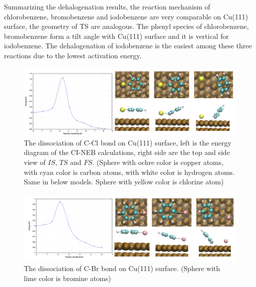\documentclass[%
 reprint,
 amsmath,amssymb,
 aps,
prb,
]{revtex4-1}
\begin{document}

Summarizing the dehalogenation results, the reaction mechanism of chlorobenzene, bromobenzene and iodobenzene are very comparable on Cu(111) surface, the geometry of TS are analogous. The phenyl species of chlorobenzene, bromobenzene form a tilt angle with Cu(111) surface and it is vertical for iodobenzene. The dehalogenation of iodobenzene is the easiest among these three reactions due to the lowest activation energy.

\begin{figure}[hbt]
\centering
\includegraphics[width=1.0\textwidth]{Fig/dissociation_Cl.png}
\caption{The dissociation of C-Cl bond on Cu(111) surface, left is the energy diagram of the CI-NEB calculations, right side are the top and side view of $IS$, $TS$ and $FS$. (Sphere with ochre color is copper atoms, with cyan color is carbon atoms, with white color is hydrogen atoms. Same in below models. Sphere with yellow color is chlorine atom)}
\label{fig:dissociation_Cl}
\end{figure}

\begin{figure}[hbt]
\centering
\includegraphics[width=1.0\textwidth]{Fig/dissociation_Br.png}
\caption{The dissociation of C-Br bond on Cu(111) surface. (Sphere with lime color is bromine atoms)}
\label{fig:dissociation_Br}
\end{figure}
\end{document}
